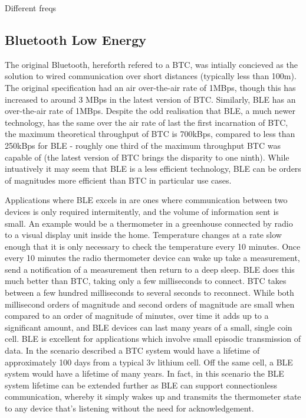 \documentclass[]{article}
\begin{document}
Different freqs



\subsection{Bluetooth Low Energy}
The original Bluetooth, hereforth refered to a \ac{BTC}, was intially concieved as the solution to wired communication over short distances (typically less than 100m). The original specification had an air over-the-air rate of 1MBps, though this has increased to around 3 MBps in the latest version of \ac{BTC}. Similarly, BLE has an over-the-air rate of 1MBps. Despite the odd realisation that \ac{BLE}, a much newer technology, has the same over the air rate of last the first incarnation of \ac{BTC}, the maximum theoretical throughput of \ac{BTC} is 700kBps, compared to less than 250kBps for \ac{BLE} - roughly one third of the maximum throughput \ac{BTC} was capable of (the latest version of \ac{BTC} brings the disparity to one ninth). While intuatively it may seem that \ac{BLE} is a less efficient technology, \ac{BLE} can be orders of magnitudes more efficient than \ac{BTC} in particular use cases.

Applications where \ac{BLE} excels in are ones where communication between two devices is only required intermitently, and the volume of information sent is small. An example would be a thermometer in a greenhouse connected by radio to a visual display unit inside the home. Temperature changes at a rate slow enough that it is only necessary to check the temperature every 10 minutes. Once every 10 minutes the radio thermometer device can wake up take a measurement, send a notification of a measurement then return to a deep sleep. \ac{BLE} does this much better than \ac{BTC}, taking only a few milliseconds to connect. \ac{BTC} takes between a few hundred milliseconds to several seconds to reconnect. While both millisecond orders of magnitude and second orders of magnitude are small when compared to an order of magnitude of minutes, over time it adds up to a significant amount, and \ac{BLE} devices can last many years of a small, single coin cell. \ac{BLE} is excellent for applications which involve small episodic transmission of data. In the scenario described a \ac{BTC} system would have a lifetime of approximately 100 days from a typical 3v lithium cell. Off the same cell, a \ac{BLE} system would have a lifetime of many years. In fact, in this scenario the \ac{BLE} system lifetime can be extended further as \ac{BLE} can support connectionless communication, whereby it simply wakes up and transmits the thermometer state to any device that's listening without the need for acknowledgement.
\end{document}
